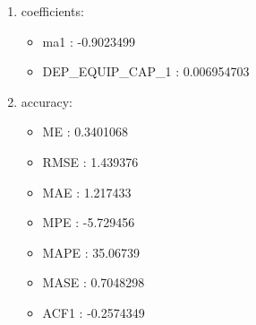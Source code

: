 \documentclass[10pt,a4paper]{article}\usepackage[]{graphicx}\usepackage[]{color}
\newcommand{\AaA}{\_}
\begin{document}
\begin{multicols}{2}
\begin{enumerate}
\item coefficients:
\begin{itemize}
\item  ma1 :  -0.9023499 
\item  DEP\AaA EQUIP\AaA CAP\AaA 1 :  0.006954703 
\end{itemize}
\item accuracy:
\begin{itemize}
\item  ME :  0.3401068 
\item  RMSE :  1.439376 
\item  MAE :  1.217433 
\item  MPE :  -5.729456 
\item  MAPE :  35.06739 
\item  MASE :  0.7048298 
\item  ACF1 :  -0.2574349 
\end{itemize}
\end{enumerate}
\end{multicols}
\end{document}
